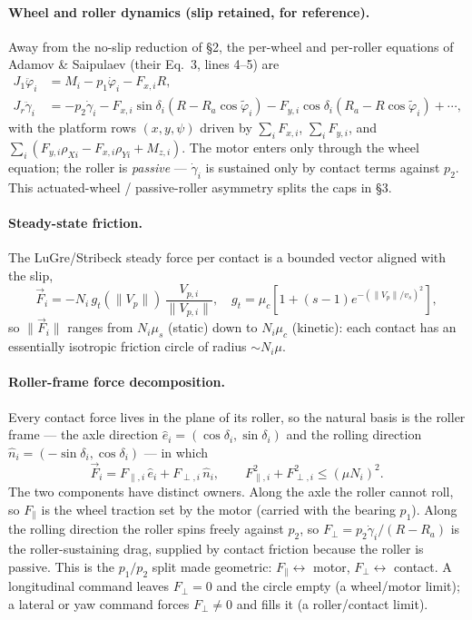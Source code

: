 \documentclass[11pt]{article}
\begin{document}
\paragraph{Wheel and roller dynamics (slip retained, for reference).} Away from the no-slip
reduction of \S2, the per-wheel and per-roller equations of Adamov \& Saipulaev (their Eq.\ 3,
lines 4--5) are
\begin{align}
J_1\ddot\varphi_i&=M_i-p_1\dot\varphi_i-F_{x,i}R,\\
J_r\ddot\gamma_i&=-p_2\dot\gamma_i-F_{x,i}\sin\delta_i\!\left(R-R_a\cos\tilde\varphi_i\right)
-F_{y,i}\cos\delta_i\!\left(R_a-R\cos\tilde\varphi_i\right)+\cdots,
\end{align}
with the platform rows $(x,y,\psi)$ driven by $\sum_i F_{x,i}$, $\sum_i F_{y,i}$, and
$\sum_i(F_{y,i}\rho_{Xi}-F_{x,i}\rho_{Yi}+M_{z,i})$. The motor enters only through the wheel
equation; the roller is \emph{passive} --- $\dot\gamma_i$ is sustained only by contact terms
against $p_2$. This actuated-wheel / passive-roller asymmetry splits the caps in \S3.

\paragraph{Steady-state friction.} The LuGre/Stribeck steady force per contact is a bounded
vector aligned with the slip,
\begin{equation}
\vec F_i=-N_i\,g_t(\|V_p\|)\,\frac{V_{p,i}}{\|V_{p,i}\|},\quad
g_t=\mu_c\!\left[1+(s-1)e^{-(\|V_p\|/v_s)^2}\right],
\end{equation}
so $\|\vec F_i\|$ ranges from $N_i\mu_s$ (static) down to $N_i\mu_c$ (kinetic): each contact has
an essentially isotropic friction circle of radius $\sim N_i\mu$.

\paragraph{Roller-frame force decomposition.} Every contact force lives in the plane of its
roller, so the natural basis is the roller frame --- the axle direction
$\hat e_i=(\cos\delta_i,\sin\delta_i)$ and the rolling direction
$\hat n_i=(-\sin\delta_i,\cos\delta_i)$ --- in which
\begin{equation}
\vec F_i=F_{\parallel,i}\,\hat e_i+F_{\perp,i}\,\hat n_i,\qquad
F_{\parallel,i}^2+F_{\perp,i}^2\le(\mu N_i)^2 .
\label{eq:rollerframe}
\end{equation}
The two components have distinct owners. Along the axle the roller cannot roll, so
$F_\parallel$ is the wheel traction set by the motor (carried with the bearing $p_1$). Along the
rolling direction the roller spins freely against $p_2$, so $F_\perp=p_2\dot\gamma_i/(R-R_a)$ is
the roller-sustaining drag, supplied by contact friction because the roller is passive. This is
the $p_1/p_2$ split made geometric: $F_\parallel\leftrightarrow$ motor,
$F_\perp\leftrightarrow$ contact. A longitudinal command leaves $F_\perp=0$ and the circle empty
(a wheel/motor limit); a lateral or yaw command forces $F_\perp\ne0$ and fills it (a
roller/contact limit).
\end{document}
